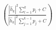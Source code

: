 \documentclass[preview]{standalone}
\begin{document}
\begin{align*}
\left(\frac{\left|{\hat{h}_k}\right|^2\sum_{l=1}^{k}p_l+ C}{\left|{\hat{h}_k}\right|^2\sum_{j=1}^{k-1}p_j+ C}\right)
\end{align*}
\end{document}
